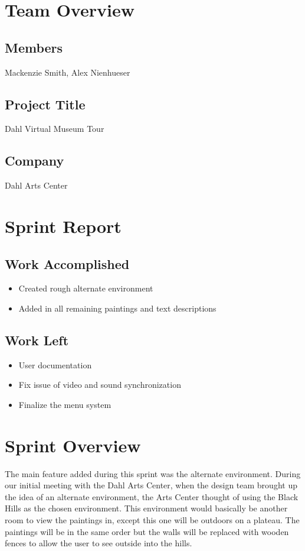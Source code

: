 \documentclass[11pt]{book}
\begin{document}

\section*{Team Overview}
\hrulefill
\subsection*{Members}
Mackenzie Smith, Alex Nienhueser

\subsection*{Project Title}
Dahl Virtual Museum Tour

\subsection*{Company}
Dahl Arts Center


\section*{Sprint Report}

\hrulefill
\subsection*{Work Accomplished}
\begin{itemize}
\item Created rough alternate environment
\item Added in all remaining paintings and text descriptions


\end{itemize}
\subsection*{Work Left}
\begin{itemize}
\item User documentation
\item Fix issue of video and sound synchronization
\item Finalize the menu system
\end{itemize}

\section*{Sprint Overview}
The main feature added during this sprint was the alternate environment.  During our initial meeting with the Dahl Arts Center, when the design team brought up the idea of an alternate environment, the Arts Center thought of using the Black Hills as the chosen environment.  This environment would basically be another room to view the paintings in, except this one will be outdoors on a plateau.  The paintings will be in the same order but the walls will be replaced with wooden fences to allow the user to see outside into the hills.
\end{document}
